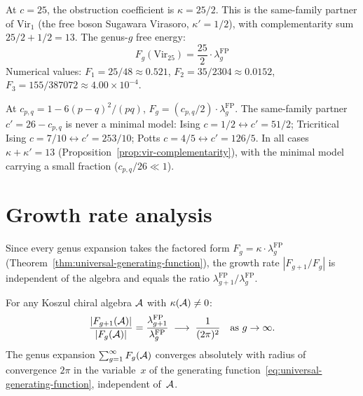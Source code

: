 \begin{computation}[Virasoro at \texorpdfstring{$c = 25$}{c = 25}]
\label{comp:vir-c25-genera}
At $c = 25$, the obstruction coefficient is
$\kappa = 25/2$.  This is the same-family partner of
$\mathrm{Vir}_1$ (the free boson Sugawara Virasoro,
$\kappa' = 1/2$), with complementarity sum
$25/2 + 1/2 = 13$.  The genus-$g$ free energy:
\[
F_g(\mathrm{Vir}_{25}) = \frac{25}{2}
\cdot \lambda_g^{\mathrm{FP}}
\]
Numerical values:
$F_1 = 25/48 \approx 0.521$,
$F_2 = 35/2304 \approx 0.0152$,
$F_3 = 155/387072 \approx 4.00 \times 10^{-4}$.
\end{computation}

\begin{remark}
\label{rem:minimal-model-genera}
At $c_{p,q} = 1 - 6(p-q)^2/(pq)$, $F_g = (c_{p,q}/2) \cdot \lambda_g^{\mathrm{FP}}$.  The same-family partner $c' = 26 - c_{p,q}$ is never a minimal model: Ising $c=1/2 \leftrightarrow c'=51/2$; Tricritical Ising $c=7/10 \leftrightarrow c'=253/10$; Potts $c=4/5 \leftrightarrow c'=126/5$.  In all cases $\kappa + \kappa' = 13$ (Proposition~\ref{prop:vir-complementarity}), with the minimal model carrying a small fraction ($c_{p,q}/26 \ll 1$).
\end{remark}


\section{Growth rate analysis}\label{sec:growth-rate-genera}

Since every genus expansion takes the factored form
$F_g = \kappa \cdot \lambda_g^{\mathrm{FP}}$
(Theorem~\ref{thm:universal-generating-function}), the
growth rate $|F_{g+1}/F_g|$ is independent of the algebra
and equals the ratio
$\lambda_{g+1}^{\mathrm{FP}}/\lambda_g^{\mathrm{FP}}$.

\begin{proposition}\label{prop:universal-growth-rate}
For any Koszul chiral algebra $\mathcal{A}$ with $\kappa(\mathcal{A}) \neq 0$:
\begin{equation}\label{eq:universal-growth-rate}
\frac{|F_{g+1}(\mathcal{A})|}{|F_g(\mathcal{A})|}
= \frac{\lambda_{g+1}^{\mathrm{FP}}}
{\lambda_g^{\mathrm{FP}}}
\;\longrightarrow\; \frac{1}{(2\pi)^2}
\quad \text{as } g \to \infty.
\end{equation}
The genus expansion $\sum_{g=1}^\infty F_g(\mathcal{A})$
converges absolutely with radius of convergence $2\pi$
in the variable~$x$ of the generating function~\eqref{eq:universal-generating-function}, independent
of~$\mathcal{A}$.
\end{proposition}

